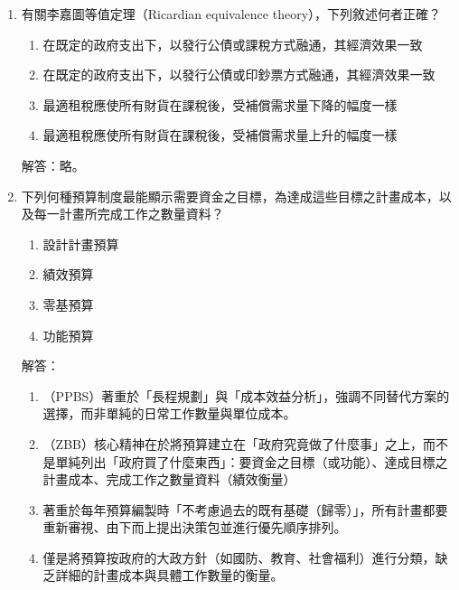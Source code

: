 \documentclass[12pt, a4paper]{article}
\begin{document}
\begin{enumerate}
    \item 有關李嘉圖等值定理（Ricardian equivalence theory），下列敘述何者正確？
    \begin{enumerate}[label=\Alph*.]
        \item 在既定的政府支出下，以發行公債或課稅方式融通，其經濟效果一致
        \item 在既定的政府支出下，以發行公債或印鈔票方式融通，其經濟效果一致
        \item 最適租稅應使所有財貨在課稅後，受補償需求量下降的幅度一樣
        \item 最適租稅應使所有財貨在課稅後，受補償需求量上升的幅度一樣
    \end{enumerate}
    解答：略。

    \item 下列何種預算制度最能顯示需要資金之目標，為達成這些目標之計畫成本，以及每一計畫所完成工作之數量資料？
    \begin{enumerate}[label=\Alph*.]
        \item 設計計畫預算
        \item 績效預算
        \item 零基預算
        \item 功能預算
    \end{enumerate}
    解答：
    \begin{enumerate}[label=\Alph*.]
        \item （PPBS）著重於「長程規劃」與「成本效益分析」，強調不同替代方案的選擇，而非單純的日常工作數量與單位成本。
        \item （ZBB）核心精神在於將預算建立在「政府究竟做了什麼事」之上，而不是單純列出「政府買了什麼東西」：要資金之目標（或功能）、達成目標之計畫成本、完成工作之數量資料（績效衡量）
        \item 著重於每年預算編製時「不考慮過去的既有基礎（歸零）」，所有計畫都要重新審視、由下而上提出決策包並進行優先順序排列。
        \item 僅是將預算按政府的大政方針（如國防、教育、社會福利）進行分類，缺乏詳細的計畫成本與具體工作數量的衡量。
    \end{enumerate}


\end{enumerate}
\end{document}
